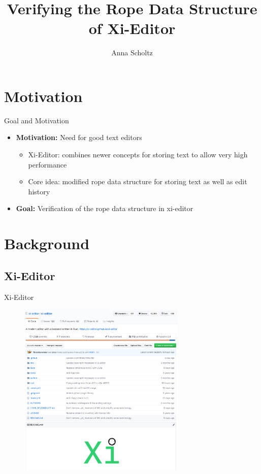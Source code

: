 \documentclass{beamer}
\begin{document}
\title[Verifying the Rope datastructure of Xi-Editor]{Verifying the Rope Data Structure of Xi-Editor}

\author{Anna Scholtz}




\frame[plain]{
    \titlepage
}




\section{Motivation}

\begin{frame}{Goal and Motivation}
  \begin{itemize}
    \item \textbf{Motivation:} Need for good text editors
    \begin{itemize}
      \item Xi-Editor: combines newer concepts for storing text to allow very high performance
      \item Core idea: modified rope data structure for storing text as well as edit history
    \end{itemize}
    \item \textbf{Goal:} Verification of the rope data structure in xi-editor  %
  \end{itemize}
\end{frame}


\section{Background}

\subsection{Xi-Editor}

\begin{frame}{Xi-Editor}
    \begin{figure}
        \centering
        \includegraphics[width=8cm]{images/xi-github.png}
    \end{figure}
\end{frame}
\end{document}
